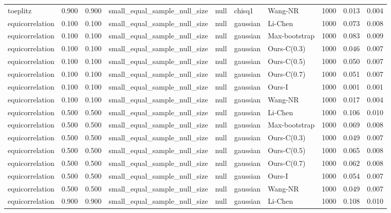 \begin{tabular}{lrrllllrrr}
toeplitz & 0.900 & 0.900 & small\_equal\_sample\_null\_size & null & chisq1 & Wang-NR & 1000 & 0.013 & 0.004 \\
equicorrelation & 0.100 & 0.100 & small\_equal\_sample\_null\_size & null & gaussian & Li-Chen & 1000 & 0.073 & 0.008 \\
equicorrelation & 0.100 & 0.100 & small\_equal\_sample\_null\_size & null & gaussian & Max-bootstrap & 1000 & 0.083 & 0.009 \\
equicorrelation & 0.100 & 0.100 & small\_equal\_sample\_null\_size & null & gaussian & Ours-C(0.3) & 1000 & 0.046 & 0.007 \\
equicorrelation & 0.100 & 0.100 & small\_equal\_sample\_null\_size & null & gaussian & Ours-C(0.5) & 1000 & 0.050 & 0.007 \\
equicorrelation & 0.100 & 0.100 & small\_equal\_sample\_null\_size & null & gaussian & Ours-C(0.7) & 1000 & 0.051 & 0.007 \\
equicorrelation & 0.100 & 0.100 & small\_equal\_sample\_null\_size & null & gaussian & Ours-I & 1000 & 0.001 & 0.001 \\
equicorrelation & 0.100 & 0.100 & small\_equal\_sample\_null\_size & null & gaussian & Wang-NR & 1000 & 0.017 & 0.004 \\
equicorrelation & 0.500 & 0.500 & small\_equal\_sample\_null\_size & null & gaussian & Li-Chen & 1000 & 0.106 & 0.010 \\
equicorrelation & 0.500 & 0.500 & small\_equal\_sample\_null\_size & null & gaussian & Max-bootstrap & 1000 & 0.069 & 0.008 \\
equicorrelation & 0.500 & 0.500 & small\_equal\_sample\_null\_size & null & gaussian & Ours-C(0.3) & 1000 & 0.049 & 0.007 \\
equicorrelation & 0.500 & 0.500 & small\_equal\_sample\_null\_size & null & gaussian & Ours-C(0.5) & 1000 & 0.065 & 0.008 \\
equicorrelation & 0.500 & 0.500 & small\_equal\_sample\_null\_size & null & gaussian & Ours-C(0.7) & 1000 & 0.062 & 0.008 \\
equicorrelation & 0.500 & 0.500 & small\_equal\_sample\_null\_size & null & gaussian & Ours-I & 1000 & 0.054 & 0.007 \\
equicorrelation & 0.500 & 0.500 & small\_equal\_sample\_null\_size & null & gaussian & Wang-NR & 1000 & 0.049 & 0.007 \\
equicorrelation & 0.900 & 0.900 & small\_equal\_sample\_null\_size & null & gaussian & Li-Chen & 1000 & 0.108 & 0.010 \\

\end{tabular}
